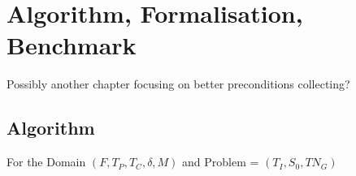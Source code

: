 \chapter{Algorithm, Formalisation, Benchmark}\label{chap:content}
\large{Possibly another chapter focusing on better preconditions collecting?}


\section{Algorithm}


For the Domain $(F, T_P, T_C, \delta, M)$ and Problem = $(T_I, S_0, TN_G)$
